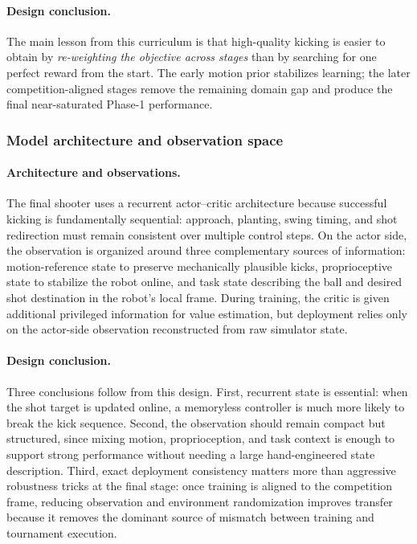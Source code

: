 \documentclass{article}
\begin{document}
\paragraph{Design conclusion.} The main lesson from this curriculum is that
high-quality kicking is easier to obtain by \emph{re-weighting the objective
across stages} than by searching for one perfect reward from the start. The
early motion prior stabilizes learning; the later competition-aligned stages
remove the remaining domain gap and produce the final near-saturated Phase-1
performance.

\subsubsection{Model architecture and observation space}\label{sec:sh-arch}

\paragraph{Architecture and observations.} The final shooter uses a recurrent
actor--critic architecture because successful kicking is fundamentally
sequential: approach, planting, swing timing, and shot redirection must remain
consistent over multiple control steps. On the actor side, the observation is
organized around three complementary sources of information: motion-reference
state to preserve mechanically plausible kicks, proprioceptive state to
stabilize the robot online, and task state describing the ball and desired shot
destination in the robot's local frame. During training, the critic is given
additional privileged information for value estimation, but deployment relies
only on the actor-side observation reconstructed from raw simulator state.

\paragraph{Design conclusion.} Three conclusions follow from this design.
First, recurrent state is essential: when the shot target is updated online, a
memoryless controller is much more likely to break the kick sequence. Second,
the observation should remain compact but structured, since mixing motion,
proprioception, and task context is enough to support strong performance without
needing a large hand-engineered state description. Third, exact deployment
consistency matters more than aggressive robustness tricks at the final stage:
once training is aligned to the competition frame, reducing observation and
environment randomization improves transfer because it removes the dominant
source of mismatch between training and tournament execution.
\end{document}
